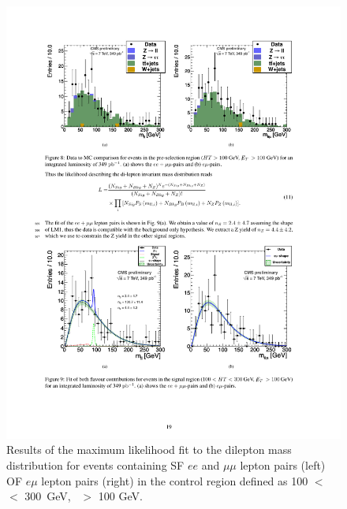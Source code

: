 \begin{figure}[tbh]
\begin{center}
\includegraphics[width=0.75\linewidth]{plots_final/dilmass_control.pdf}
\caption{\label{fig:dilmasscontrol}\protect 
Results of the maximum likelihood fit to the dilepton mass distribution for events containing 
SF $ee$ and $\mu\mu$ lepton pairs (left) OF $e\mu$ lepton pairs (right) in the control
region defined as 100 $<$ \Ht\ $<$ 300~GeV, \MET\ $>$ 100 GeV.
}
\end{center}
\end{figure}

